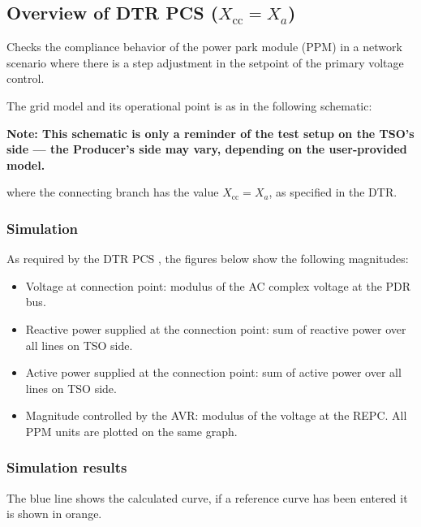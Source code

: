     \subsection{Overview of DTR PCS \DTRPcs{} ($X_\text{cc} = X_a$)}

    Checks the compliance behavior of the power park module (PPM) in a network
    scenario where there is a step adjustment in the setpoint of the primary voltage
    control.

    The grid model and its operational point is as in the following schematic:
    \begin{center}
        
    \end{center}
    \begin{center}
        \small \textbf{Note: This schematic is only a reminder of the test setup on the TSO's
        side --- the Producer's side may vary, depending on the user-provided model.}
    \end{center}
    where the connecting branch has the value $X_\text{cc} = X_a$, as specified in
    the DTR.


    \subsubsection{Simulation}
    As required by the DTR PCS \DTRPcs, the figures below show the
    following magnitudes:
    \begin{itemize}
        \item Voltage at connection point: modulus of the AC complex voltage at
        the PDR bus.
        \item Reactive power supplied at the connection point: sum of reactive power
        over all lines on TSO side.
        \item Active power supplied at the connection point: sum of active power
        over all lines on TSO side.
        \item Magnitude controlled by the AVR: modulus of the voltage at the REPC.
        All PPM units are plotted on the same graph.
    \end{itemize}

    \subsubsection{Simulation results}
    The blue line shows the calculated curve, if a reference curve has been entered it is
    shown in orange.

